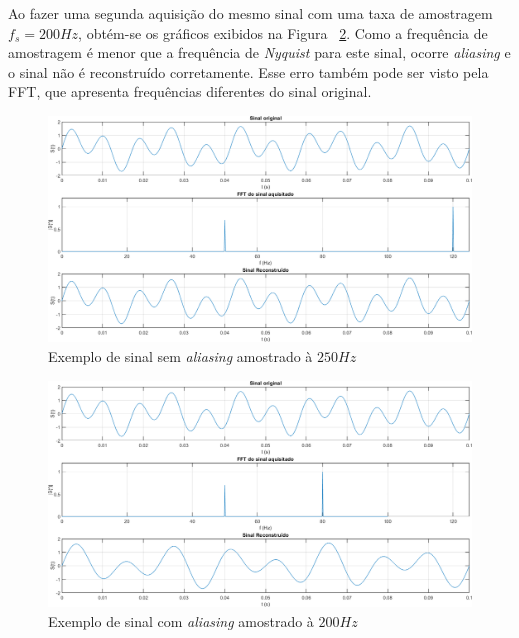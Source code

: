 \documentclass[11pt]{abntex2}
\begin{document}
				Ao fazer uma segunda aquisição do mesmo sinal com uma taxa de
				amostragem $f_s = 200Hz$, obtém-se os gráficos exibidos na
				Figura ~\ref{fig:exemploAliasing200}. Como a frequência de amostragem
				é menor que a frequência de \textit{Nyquist} para este sinal, ocorre
				\textit{aliasing} e o sinal não é reconstruído corretamente.
				Esse erro também pode ser visto pela FFT, que apresenta
				frequências diferentes do sinal original.

				\newpage

				\begin{figure}[!ht]
					\centering
					\includegraphics[width=\linewidth]{../../Fotos/aliasingFs250.png}
					\caption{Exemplo de sinal sem \textit{aliasing} amostrado à $250Hz$}
					\label{fig:exemploAliasing250}
				\end{figure}

				\begin{figure}[H]
					\centering
					\includegraphics[width=\linewidth]{../../Fotos/aliasingFs200.png}
					\caption{Exemplo de sinal com \textit{aliasing} amostrado à $200Hz$}
					\label{fig:exemploAliasing200}
				\end{figure}
\end{document}
